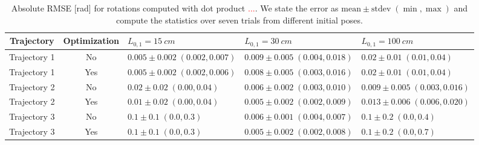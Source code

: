 \begin{table}
\centering
\caption{Absolute \gls{RMSE} [rad] for rotations computed with dot product \textcolor{red}{...}. We state the error as $\text{mean} \pm \text{stdev} \; (\min, \max)$ and compute the statistics over seven trials from different initial poses.}
\begin{tabular}{cclll}\toprule
\textbf{Trajectory} & \textbf{Optimization} & $L_{0,1} = \SI{15}{cm}$ & $L_{0,1} = \SI{30}{cm}$ & $L_{0,1} = \SI{100}{cm}$\\
\midrule
    Trajectory 1 & No & $0.005 \pm 0.002 \; (0.002, 0.007)$ & $0.009 \pm 0.005 \; (0.004, 0.018)$ & $0.02 \pm 0.01 \; (0.01, 0.04)$ \\
    Trajectory 1 & Yes & $0.005 \pm 0.002 \; (0.002, 0.006)$ & $0.008 \pm 0.005 \; (0.003, 0.016)$ & $0.02 \pm 0.01 \; (0.01, 0.04)$ \\
    \midrule
    Trajectory 2 & No & $0.02 \pm 0.02 \; (0.00, 0.04)$ & $0.006 \pm 0.002 \; (0.003, 0.010)$ & $0.009 \pm 0.005 \; (0.003, 0.016)$ \\
    Trajectory 2 & Yes & $0.01 \pm 0.02 \; (0.00, 0.04)$ & $0.005 \pm 0.002 \; (0.002, 0.009)$ & $0.013 \pm 0.006 \; (0.006, 0.020)$ \\
    \midrule
    Trajectory 3 & No & $0.1 \pm 0.1 \; (0.0, 0.3)$ & $0.006 \pm 0.001 \; (0.004, 0.007)$ & $0.1 \pm 0.2 \; (0.0, 0.4)$ \\
    Trajectory 3 & Yes & $0.1 \pm 0.1 \; (0.0, 0.3)$ & $0.005 \pm 0.002 \; (0.002, 0.008)$ & $0.1 \pm 0.2 \; (0.0, 0.7)$ \\
\bottomrule
\end{tabular}
\label{tab:srslam:results_simulations_rotation_z_angle}
\end{table}
\fi

